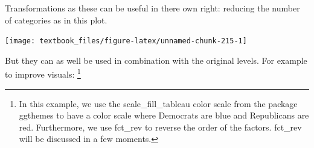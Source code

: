 \documentclass[]{tufte-book}
\newenvironment{Shaded}{}{}
\newcommand{\DataTypeTok}[1]{\textcolor[rgb]{0.56,0.13,0.00}{#1}}
\newcommand{\KeywordTok}[1]{\textcolor[rgb]{0.00,0.44,0.13}{\textbf{#1}}}
\newcommand{\NormalTok}[1]{#1}
\newcommand{\OperatorTok}[1]{\textcolor[rgb]{0.40,0.40,0.40}{#1}}
\newcommand{\StringTok}[1]{\textcolor[rgb]{0.25,0.44,0.63}{#1}}
\begin{document}
\begin{Shaded}
\end{Shaded}

Transformations as these can be useful in there own right: reducing the number of categories as in this plot.

\begin{Shaded}
\end{Shaded}

\texttt{[image: textbook\_files/figure-latex/unnamed-chunk-215-1]}

But they can as well be used in combination with the original levels. For example to improve visuals: \footnote{In this example, we use the scale\_fill\_tableau color scale from the package ggthemes to have a color scale where Democrats are blue and Republicans are red. Furthermore, we use fct\_rev to reverse the order of the factors. fct\_rev will be discussed in a few moments.}
\end{document}
